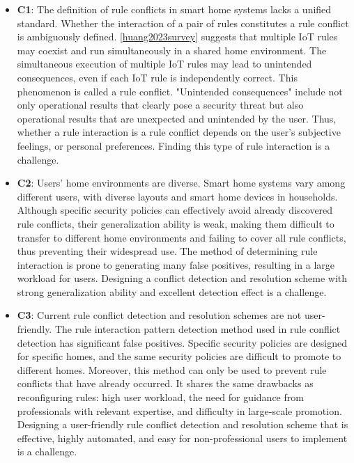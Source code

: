 \begin{itemize}
	\item \textbf{C1}: The definition of rule conflicts in smart home systems lacks a unified standard. Whether the interaction of a pair of rules constitutes a rule conflict is ambiguously defined. \ref{huang2023survey} suggests that multiple IoT rules may coexist and run simultaneously in a shared home environment. The simultaneous execution of multiple IoT rules may lead to unintended consequences, even if each IoT rule is independently correct. This phenomenon is called a rule conflict. "Unintended consequences" include not only operational results that clearly pose a security threat but also operational results that are unexpected and unintended by the user. Thus, whether a rule interaction is a rule conflict depends on the user's subjective feelings, or personal preferences. Finding this type of rule interaction is a challenge.
	
	\item \textbf{C2}: Users' home environments are diverse. Smart home systems vary among different users, with diverse layouts and smart home devices in households. Although specific security policies can effectively avoid already discovered rule conflicts, their generalization ability is weak, making them difficult to transfer to different home environments and failing to cover all rule conflicts, thus preventing their widespread use. The method of determining rule interaction is prone to generating many false positives, resulting in a large workload for users. Designing a conflict detection and resolution scheme with strong generalization ability and excellent detection effect is a challenge.
	
	\item \textbf{C3}: Current rule conflict detection and resolution schemes are not user-friendly. The rule interaction pattern detection method used in rule conflict detection has significant false positives. Specific security policies are designed for specific homes, and the same security policies are difficult to promote to different homes. Moreover, this method can only be used to prevent rule conflicts that have already occurred. It shares the same drawbacks as reconfiguring rules: high user workload, the need for guidance from professionals with relevant expertise, and difficulty in large-scale promotion. Designing a user-friendly rule conflict detection and resolution scheme that is effective, highly automated, and easy for non-professional users to implement is a challenge.
\end{itemize}

